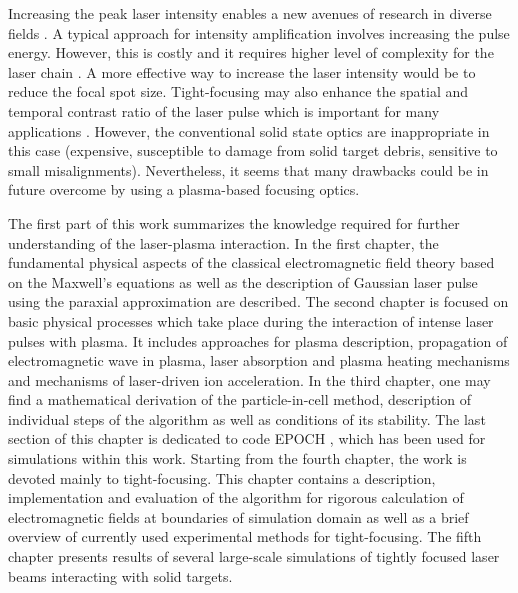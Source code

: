 Increasing the peak laser intensity enables a new avenues of research in diverse fields \cite{Zewail2010, Bulanov2004, Malka2004}. A typical approach for intensity amplification involves increasing the pulse energy. However, this is costly and it requires higher level of complexity for the laser chain \cite{Fuchs2014}. A more effective way to increase the laser intensity would be to reduce the focal spot size. Tight-focusing may also enhance the spatial and temporal contrast ratio of the laser pulse which is important for many applications \cite{Fuchs2014}. However, the conventional solid state optics are inappropriate in this case (expensive, susceptible to damage from solid target debris, sensitive to small misalignments). Nevertheless, it seems that many drawbacks could be in future overcome by using a plasma-based focusing optics.

The first part of this work summarizes the knowledge required for further understanding of the laser-plasma interaction. In the first chapter, the fundamental physical aspects of the classical electromagnetic field theory \cite{Stratton2007, Jackson2005, Feynman1963, Thide2011} based on the Maxwell's equations as well as the description of Gaussian laser pulse using the paraxial approximation \cite{Born2013} are described. The second chapter is focused on basic physical processes which take place during the interaction of intense laser pulses with plasma. It includes approaches for plasma description, propagation of electromagnetic wave in plasma, laser absorption and plasma heating mechanisms and mechanisms of laser-driven ion acceleration. In the third chapter, one may find a mathematical derivation of the particle-in-cell method, description of individual steps of the algorithm as well as conditions of its stability. The last section of this chapter is dedicated to code EPOCH \cite{bennett}, which has been used for simulations within this work. Starting from the fourth chapter, the work is devoted mainly to tight-focusing. This chapter contains a description, implementation and evaluation of the algorithm for rigorous calculation of electromagnetic fields at boundaries of simulation domain \cite{Thiele2016} as well as a brief overview of currently used experimental methods for tight-focusing. The fifth chapter presents results of several large-scale simulations of tightly focused laser beams interacting with solid targets.

